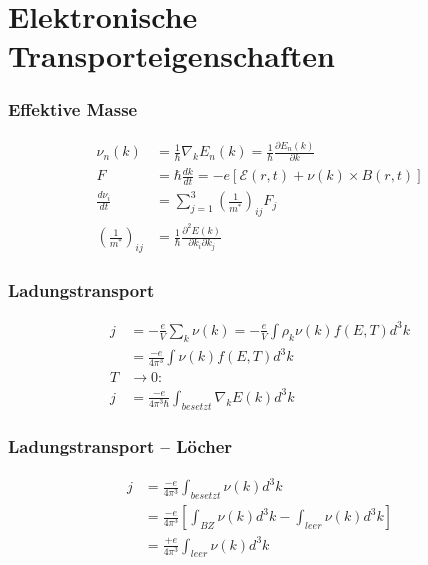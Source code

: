 \section{Elektronische Transporteigenschaften}


\subsubsection*{Effektive Masse}

\begin{equation*}
    \begin{aligned}
        \nu_n(k) &= \frac{1}{\hbar} \nabla_k E_n(k) = \frac{1}{\hbar} \frac{\partial E_n(k)}{\partial k} \\
        F &= \hbar \frac{dk}{dt} = -e \left[\mathcal{E}(r,t) + \nu (k) \times B(r,t)\right] \\
        \frac{d \nu_i}{dt} &= \sum_{j=1}^3 \left(\frac{1}{m^*}\right)_{ij} F_j \\
        \left(\frac{1}{m^*}\right)_{ij} &= \frac{1}{\hbar} \frac{\partial^2 E(k)}{\partial k_i \partial k_j}
    \end{aligned}
\end{equation*}


\subsubsection*{Ladungstransport}
\begin{equation*}
    \begin{aligned}
        j &= - \frac{e}{V} \sum_k \nu(k) = - \frac{e}{V} \int \rho_k \nu (k) f(E,T) d^3k \\
            &= \frac{-e}{4 \pi^3} \int \nu (k) f(E,T) d^3k \\
        T &\rightarrow 0: \\
        j &= \frac{-e}{4 \pi^3 \hbar} \int_{besetzt} \nabla_k E(k) d^3k
    \end{aligned}
\end{equation*}

\subsubsection*{Ladungstransport – Löcher}

\begin{equation*}
    \begin{aligned}
        j &= \frac{-e}{4 \pi^3} \int_{besetzt} \nu(k) d^3k \\
          &= \frac{-e}{4 \pi^3} \left[\int_{BZ} \nu(k) d^3 k - \int_{leer} \nu(k) d^3k\right] \\
          &= \frac{+e}{4 \pi^3} \int_{leer} \nu(k) d^3k
    \end{aligned}
\end{equation*}

